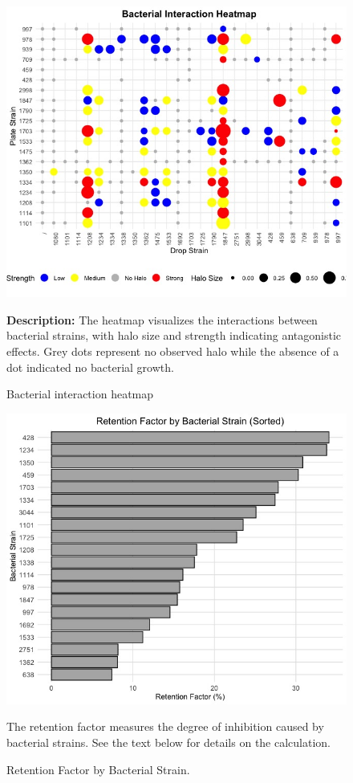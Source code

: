\begin{figure}[!ht]
    \centering
    \raggedright
    \includegraphics[width=\linewidth]{Figures/Heatmap.jpeg}
    \caption{Bacterial interaction heatmap}
    \medskip
    \textbf{Description:} The heatmap visualizes the interactions between bacterial strains, with halo size and strength indicating antagonistic effects. Grey dots represent no observed halo while the absence of a dot indicated no bacterial growth.
    \label{fig:heatmap}
\end{figure}
\begin{figure}[!ht]
    \centering
    \includegraphics[width=\linewidth]{Figures/RetentionFactor.jpeg}
    \caption{Retention Factor by Bacterial Strain.}
    The retention factor measures the degree of inhibition caused by bacterial strains. 
    See the text below for details on the calculation.
    \label{fig:retention}
\end{figure}

